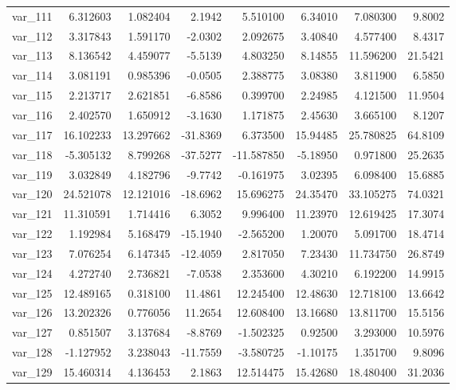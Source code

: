 ﻿\documentclass[12pt]{article}
\begin{document}
\begin{longtable}{lrrrrrrr}
 var\_111 &   6.312603 &   1.082404 &   2.1942 &   5.510100 &   6.34010 &   7.080300 &   9.8002 \\
 var\_112 &   3.317843 &   1.591170 &  -2.0302 &   2.092675 &   3.40840 &   4.577400 &   8.4317 \\
 var\_113 &   8.136542 &   4.459077 &  -5.5139 &   4.803250 &   8.14855 &  11.596200 &  21.5421 \\
 var\_114 &   3.081191 &   0.985396 &  -0.0505 &   2.388775 &   3.08380 &   3.811900 &   6.5850 \\
 var\_115 &   2.213717 &   2.621851 &  -6.8586 &   0.399700 &   2.24985 &   4.121500 &  11.9504 \\
 var\_116 &   2.402570 &   1.650912 &  -3.1630 &   1.171875 &   2.45630 &   3.665100 &   8.1207 \\
 var\_117 &  16.102233 &  13.297662 & -31.8369 &   6.373500 &  15.94485 &  25.780825 &  64.8109 \\
 var\_118 &  -5.305132 &   8.799268 & -37.5277 & -11.587850 &  -5.18950 &   0.971800 &  25.2635 \\
 var\_119 &   3.032849 &   4.182796 &  -9.7742 &  -0.161975 &   3.02395 &   6.098400 &  15.6885 \\
 var\_120 &  24.521078 &  12.121016 & -18.6962 &  15.696275 &  24.35470 &  33.105275 &  74.0321 \\
 var\_121 &  11.310591 &   1.714416 &   6.3052 &   9.996400 &  11.23970 &  12.619425 &  17.3074 \\
 var\_122 &   1.192984 &   5.168479 & -15.1940 &  -2.565200 &   1.20070 &   5.091700 &  18.4714 \\
 var\_123 &   7.076254 &   6.147345 & -12.4059 &   2.817050 &   7.23430 &  11.734750 &  26.8749 \\
 var\_124 &   4.272740 &   2.736821 &  -7.0538 &   2.353600 &   4.30210 &   6.192200 &  14.9915 \\
 var\_125 &  12.489165 &   0.318100 &  11.4861 &  12.245400 &  12.48630 &  12.718100 &  13.6642 \\
 var\_126 &  13.202326 &   0.776056 &  11.2654 &  12.608400 &  13.16680 &  13.811700 &  15.5156 \\
 var\_127 &   0.851507 &   3.137684 &  -8.8769 &  -1.502325 &   0.92500 &   3.293000 &  10.5976 \\
 var\_128 &  -1.127952 &   3.238043 & -11.7559 &  -3.580725 &  -1.10175 &   1.351700 &   9.8096 \\
 var\_129 &  15.460314 &   4.136453 &   2.1863 &  12.514475 &  15.42680 &  18.480400 &  31.2036 \\

\end{longtable}
\end{document}
